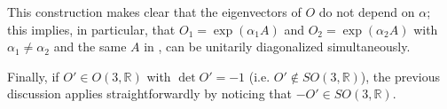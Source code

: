 \documentclass[12pt,a4paper]{article}
\begin{document}
This construction makes clear that the eigenvectors of $O$ do not depend on $\alpha$; this implies, in particular, that $O_1=\exp(\alpha_1 A)$ and $O_2=\exp(\alpha_2 A)$ with $\alpha_1\neq\alpha_2$ and the same $A$ in , can be unitarily diagonalized simultaneously.

Finally, if $O'\in O(3,\mathbb{R})$ with $\det O'=-1$ (i.e. $O'\notin SO(3,\mathbb{R})$), the previous discussion applies straightforwardly by noticing that $-O'\in SO(3,\mathbb{R})$.



\end{document}
